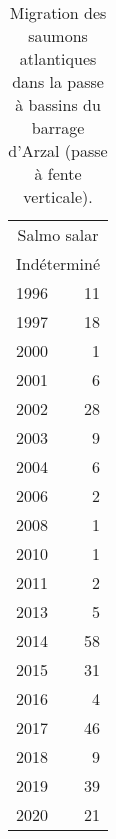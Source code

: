 \begin{table}[ht]
\centering
\begin{tabular}{lr}
  \toprule
  \multicolumn{2}{c}{Salmo salar}  \\
   \multicolumn{2}{c}{Indéterminé}\\
 \midrule
1996 & 11 \\ 
  1997 & 18 \\ 
  2000 & 1 \\ 
  2001 & 6 \\ 
  2002 & 28 \\ 
  2003 & 9 \\ 
  2004 & 6 \\ 
  2006 & 2 \\ 
  2008 & 1 \\ 
  2010 & 1 \\ 
  2011 & 2 \\ 
  2013 & 5 \\ 
  2014 & 58 \\ 
  2015 & 31 \\ 
  2016 & 4 \\ 
  2017 & 46 \\ 
  2018 & 9 \\ 
  2019 & 39 \\ 
  2020 & 21 \\ 
   \bottomrule
\end{tabular}
\caption{Migration des saumons atlantiques dans la passe à bassins du barrage
				d'Arzal (passe à fente verticale).} 
\label{table_bilanannuel_sat}
\end{table}
